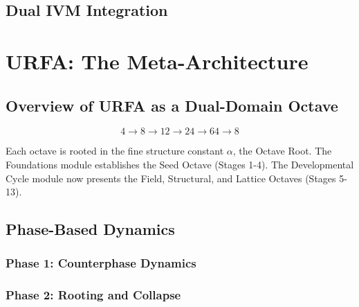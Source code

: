 \documentclass[12pt]{article}
\begin{document}
\subsection{Dual IVM Integration}


\section{URFA: The Meta-Architecture}

\subsection{Overview of URFA as a Dual-Domain Octave}


\[
4 \rightarrow 8 \rightarrow 12 \rightarrow 24 \rightarrow 64 \rightarrow 8
\]

Each octave is rooted in the fine structure constant $\alpha$, the Octave Root.
The Foundations module establishes the Seed Octave (Stages 1-4).  
The Developmental Cycle module now presents the Field, Structural, and Lattice Octaves (Stages 5-13).


% 


\subsection{Phase-Based Dynamics}

\subsubsection{Phase 1: Counterphase Dynamics}
\subsubsection{Phase 2: Rooting and Collapse}
\end{document}
